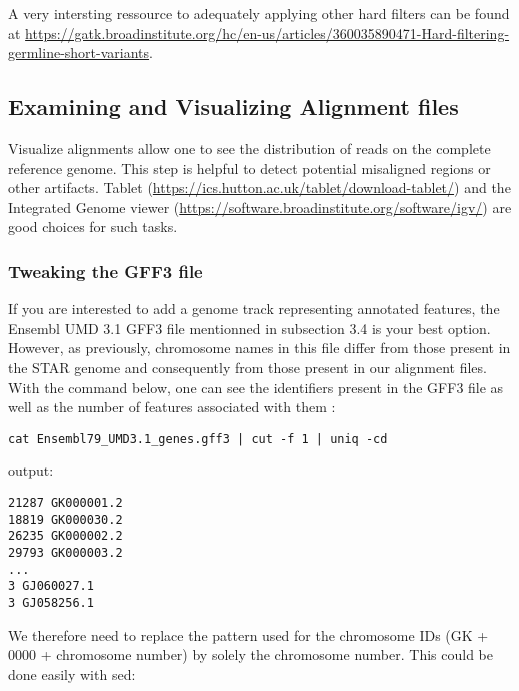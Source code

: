 A very intersting ressource to adequately applying other hard filters can be found at \href{https://gatk.broadinstitute.org/hc/en-us/articles/360035890471-Hard-filtering-germline-short-variants}{https://gatk.broadinstitute.org/hc/en-us/articles/360035890471-Hard-filtering-germline-short-variants}.





\subsection{Examining and Visualizing Alignment files}

Visualize alignments allow one to see the distribution of reads on the complete reference genome. This step is helpful to detect potential misaligned regions or other artifacts. Tablet (\href{https://ics.hutton.ac.uk/tablet/download-tablet/}{https://ics.hutton.ac.uk/tablet/download-tablet/}) and the Integrated Genome viewer (\href{https://software.broadinstitute.org/software/igv/}{https://software.broadinstitute.org/software/igv/}) are good choices for such tasks.


\subsubsection{Tweaking the GFF3 file}



If you are interested to add a genome track representing annotated features, the Ensembl UMD 3.1 GFF3 file mentionned in subsection 3.4 is your best option. However, as previously, chromosome names in this file differ from those present in the STAR genome and consequently from those present in our alignment files. With the command below, one can see the identifiers present in the GFF3 file as well as the number of features associated with them :

\begin{verbatim}
cat Ensembl79_UMD3.1_genes.gff3 | cut -f 1 | uniq -cd
\end{verbatim}


\noindent output:
\begin{verbatim}
21287 GK000001.2
18819 GK000030.2
26235 GK000002.2
29793 GK000003.2
...
3 GJ060027.1
3 GJ058256.1
\end{verbatim}

We therefore need to replace the pattern used for the chromosome IDs (GK + 0000 + chromosome number) by solely the chromosome number. This could be done easily with sed:

